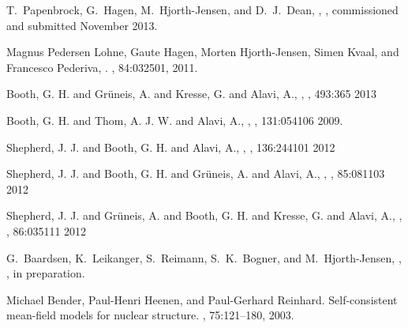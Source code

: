 \begin{thebibliography}{200}
  T.~Papenbrock, G.~Hagen, M.~Hjorth-Jensen, and  D.~J.~Dean, 
, 
,  commissioned and submitted November 2013.


Magnus Pedersen Lohne, Gaute Hagen, Morten Hjorth-Jensen, Simen Kvaal, and Francesco Pederiva,
.
, 84:032501, 2011.


 Booth, G. H. and Gr\"uneis, A. and Kresse, G.  and Alavi, A.,
, 
, 493:365 2013


 Booth, G. H.  and  Thom, A. J. W. and Alavi, A., 
,
, 131:054106 2009.

  Shepherd, J. J.  and Booth, G. H.  and Alavi, A.,
,
, 136:244101 2012


 Shepherd, J. J. and Booth, G. H. and Gr\"uneis, A. and Alavi, A.,
,
, 85:081103 2012



 Shepherd, J. J. and Gr\"uneis, A. and Booth, G. H. and Kresse, G. and Alavi, A.,
,
, 86:035111 2012




 G.~Baardsen, K.~Leikanger, S.~Reimann, S.~K.~Bogner, and M.~Hjorth-Jensen, 
, 
, in preparation.

Michael Bender, Paul-Henri Heenen, and Paul-Gerhard Reinhard.
\newblock Self-consistent mean-field models for nuclear structure.
, 75:121--180, 2003.




\end{thebibliography}
